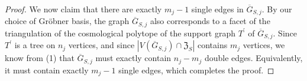 \begin{proof}
We now claim that there are exactly $m_j - 1$ single edges in $\overline{G}_{S,j}$. 
By our choice of Gr\"obner basis, the graph $\overline{G}_{S,j}$ also corresponds to a facet of the triangulation of the cosmological polytope of the support graph $T^\prime$ of $\overline{G}_{S,j}$.  
Since $T^\prime$ is a tree on $n_j$ vertices, and since $|V(\overline{G}_{S,j})\cap \mathfrak{Z}_S|$ contains $m_j$ vertices, we know from (1) that $\overline{G}_{S,j}$ must exactly contain $n_j - m_j$ double edges.
Equivalently, it must contain exactly $m_j-1$ single edges, which completes the proof. 
% 
% 
% 
% 

\end{proof}

